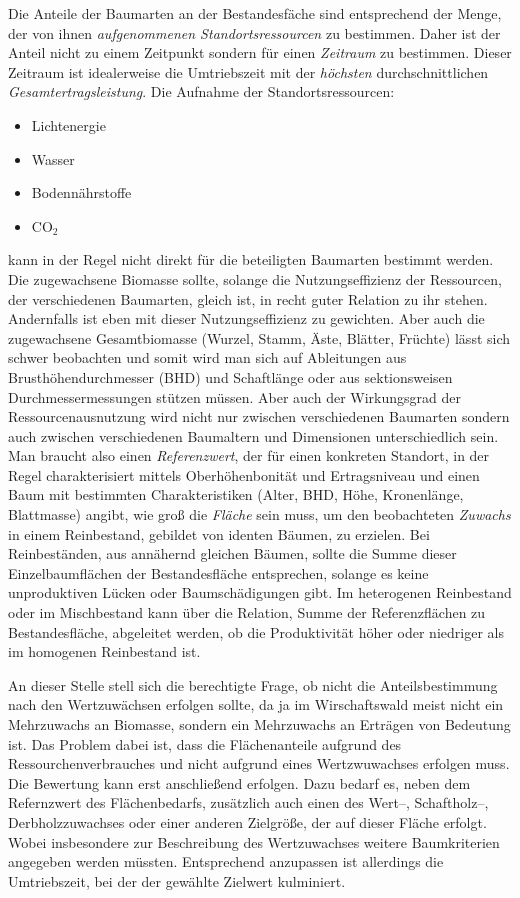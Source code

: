\documentclass[twocolumn]{scrartcl}
\begin{document}
Die Anteile der Baumarten an der Bestandesfäche sind entsprechend der
Menge, der von ihnen \emph{aufgenommenen Standortsressourcen} zu
bestimmen. Daher ist der Anteil nicht zu einem Zeitpunkt sondern für
einen \emph{Zeitraum} zu bestimmen. Dieser Zeitraum ist idealerweise
die Umtriebszeit mit der \emph{höchsten} durchschnittlichen
\emph{Gesamtertragsleistung}. Die Aufnahme der Standortsressourcen:
\begin{itemize}
\item Lichtenergie
\item Wasser
\item Bodennährstoffe
\item CO$_2$
\end{itemize}
kann in der Regel nicht direkt für die beteiligten Baumarten bestimmt
werden. Die zugewachsene Biomasse sollte, solange die
Nutzungseffizienz der Ressourcen, der verschiedenen Baumarten,
gleich ist, in recht guter Relation zu ihr stehen. Andernfalls ist
eben mit dieser Nutzungseffizienz zu gewichten. Aber auch die
zugewachsene Gesamtbiomasse (Wurzel, Stamm, Äste, Blätter, Früchte)
lässt sich schwer beobachten und somit wird man sich auf Ableitungen
aus Brusthöhendurchmesser (BHD) und Schaftlänge oder aus
sektionsweisen Durchmessermessungen stützen müssen. Aber auch der
Wirkungsgrad der Ressourcenausnutzung wird nicht nur zwischen
verschiedenen Baumarten sondern auch zwischen verschiedenen Baumaltern
und Dimensionen unterschiedlich sein. Man braucht also einen
\emph{Referenzwert}, der für einen konkreten Standort, in der Regel
charakterisiert mittels Oberhöhenbonität und Ertragsniveau und einen
Baum mit bestimmten Charakteristiken (Alter, BHD, Höhe, Kronenlänge,
Blattmasse) angibt, wie groß die \emph{Fläche} sein muss, um den
beobachteten \emph{Zuwachs} in einem Reinbestand, gebildet von identen
Bäumen, zu erzielen. Bei Reinbeständen, aus annähernd gleichen Bäumen,
sollte die Summe dieser Einzelbaumflächen der Bestandesfläche
entsprechen, solange es keine unproduktiven Lücken oder
Baumschädigungen gibt. Im heterogenen Reinbestand oder im Mischbestand
kann über die Relation, Summe der Referenzflächen zu Bestandesfläche,
abgeleitet werden, ob die Produktivität höher oder niedriger als im
homogenen Reinbestand ist.

An dieser Stelle stell sich die berechtigte Frage, ob nicht die
Anteilsbestimmung nach den Wertzuwächsen erfolgen sollte, da ja im
Wirschaftswald meist nicht ein Mehrzuwachs an Biomasse, sondern ein
Mehrzuwachs an Erträgen von Bedeutung ist. Das Problem dabei ist, dass
die Flächenanteile aufgrund des Ressourchenverbrauches und nicht
aufgrund eines Wertzwuwachses erfolgen muss. Die Bewertung kann erst
anschließend erfolgen. Dazu bedarf es, neben dem Refernzwert des
Flächenbedarfs, zusätzlich auch einen des Wert--, Schaftholz--,
Derbholzzuwachses oder einer anderen Zielgröße, der auf dieser Fläche
erfolgt. Wobei insbesondere zur Beschreibung des Wertzuwachses weitere
Baumkriterien angegeben werden müssten. Entsprechend anzupassen ist
allerdings die Umtriebszeit, bei der der gewählte Zielwert kulminiert.
\end{document}
